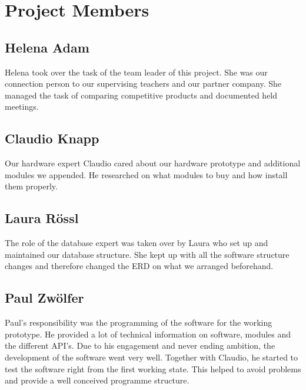 \chapter*{Project Members}
\section*{Helena Adam}
Helena took over the task of the team leader of this project. She was our connection person to our supervising teachers and our partner company. She managed the task of comparing competitive products and documented held meetings.
\begin{center}
\end{center}
\section*{Claudio Knapp}
Our hardware expert Claudio cared about our hardware prototype and additional modules we appended. He researched on what modules to buy and how install them properly. 
\begin{center}
\end{center}
\section*{Laura Rössl}
The role of the database expert was taken over by Laura who set up and maintained our database structure. She kept up with all the software structure changes and therefore changed the ERD on what we arranged beforehand. 
\begin{center}
\end{center}
\section*{Paul Zwölfer}
Paul's responsibility was the programming of the software for the working prototype. He provided a lot of technical information on software, modules and the different API's. Due to his engagement and never ending ambition, the development of the software went very well.\newline
Together with Claudio, he started to test the software right from the first working state. This helped to avoid problems and provide a well conceived programme structure.
\begin{center}
\end{center}